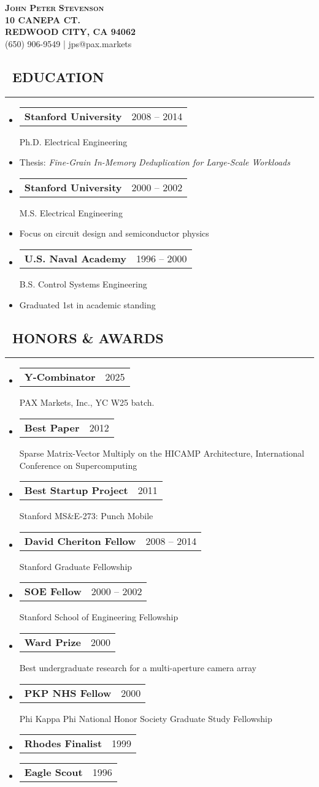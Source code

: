 \documentclass[10pt,letterpaper]{article}
\makeatletter
\newenvironment{resumesection}[1]
{%
    \subsection*{\ \textcolor{light-gray}{#1} }
    \vspace{-0.4em}
    \begin{samepage}
    \hrule
    \end{samepage}
    \vspace{+0.4em}
    \begin{itemize}[leftmargin=0.15cm]
        \parskip=0.1em
}%
{%
    \end{itemize}
}%
\newcommand{\myitem}[1] {
    \item[] \textcolor{dark-gray}{#1}
}
\newcommand{\headertri}[3] {
    \item[] \begin{tabular*}{\linewidth}{l@{\extracolsep{\fill}}r}
    \textbf{#1} & #2 \\
    \end{tabular*}
    #3
}
\newcommand{\lminiw}{0.375}
\makeatother
\begin{document}
\begin{center}
{\huge{ \textsc{ { {\bfseries John Peter} {\bfseries Stevenson} }}}} \\
\vspace{0.5em}
\textcolor{light-gray}{
\footnotesize{\textbf{10 CANEPA CT.}}  \\
\footnotesize{\textbf{REDWOOD CITY, CA 94062}}  \\
\footnotesize{{(650) 906-9549} | {jps@pax.markets}}
}
\end{center}

\begin{minipage}[t]{\lminiw\textwidth}
\begin{resumesection}{EDUCATION}
    \headertri
    {Stanford University}
    {2008 -- 2014}
    {Ph.D. Electrical Engineering}
    \myitem
    {Thesis: \textit{Fine-Grain In-Memory Deduplication for Large-Scale Workloads}}
    
    \headertri
    {Stanford University}
    {2000 -- 2002}
    {M.S. Electrical Engineering}
    \myitem
    {Focus on circuit design and semiconductor physics}
    
    \headertri
    {U.S. Naval Academy}
    {1996 -- 2000}
    {B.S. Control Systems Engineering}
    \myitem
    {Graduated 1st in academic standing}
\end{resumesection}

\begin{resumesection}{HONORS \& AWARDS}
    \headertri
    {Y-Combinator}
    {2025}
    {PAX Markets, Inc., YC W25 batch.}
    
    \headertri
    {Best Paper}
    {2012}
    {Sparse Matrix-Vector Multiply on the {{HICAMP}} Architecture, International Conference on Supercomputing}
    
    \headertri
    {Best Startup Project}
    {2011}
    {Stanford MS\&E-273: Punch Mobile}
    
    \headertri
    {David Cheriton Fellow}
    {2008 -- 2014}
    {Stanford Graduate Fellowship}
    
    \headertri
    {SOE Fellow}
    {2000 -- 2002}
    {Stanford School of Engineering Fellowship}
    
    \headertri
    {Ward Prize}
    {2000}
    {Best undergraduate research for a multi-aperture camera array}
    
    \headertri
    {PKP NHS Fellow}
    {2000}
    {Phi Kappa Phi National Honor Society Graduate Study Fellowship}
    
    \headertri
    {Rhodes Finalist}
    {1999}
    {}
    
    \headertri
    {Eagle Scout}
    {1996}
    {}
\end{resumesection}

\end{minipage}
\end{document}
